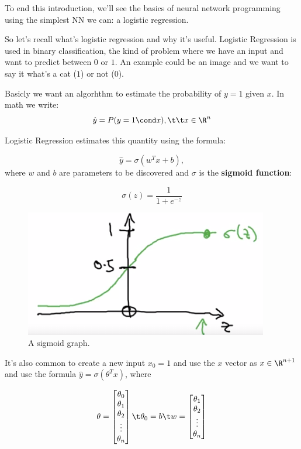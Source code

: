 \documentclass[12pt, a4paper, oneside]{book}
\begin{document}
To end this introduction, we'll see the basics of neural network programming
using the simplest NN we can: a logistic regression.

So let's recall what's logistic regression and why it's useful. Logistic
Regression is used in binary classification, the kind of problem where we have
an input and want to predict between $0$ or $1$. An example could be an image
and we want to say it what's a cat ($1$) or not ($0$).

Basicly we want an algorhthm to estimate the probability of $y=1$ given $x$. In
math we write:
\[
    \hat{y}=P(y=1\cond x),\t\t x\in\R^{n}
\]

Logistic Regression estimates this quantity using the formula:

\[
    \hat{y}=\sigma(w^{T}x+b),
\]
where $w$ and $b$ are parameters to be discovered and $\sigma$ is the
\textbf{sigmoid function}:

\[
    \sigma(z) = \dfrac{1}{1+e^{-z}}
\]

\begin{figure}[h]
\centering
\includegraphics[scale=0.7]{Res/sigmoid.png}
\caption{A sigmoid graph.}
\label{sigmoid.png}
\end{figure}

It's also common to create a new input $x_0=1$ and use the $x$ vector as
$x\in\R^{n+1}$ and use the formula $\hat{y}=\sigma(\theta^{T}x)$, where

\[
\theta=\begin{bmatrix}
    \theta_0 \\ \theta_1 \\ \theta_2 \\ \vdots \\ \theta_n
\end{bmatrix}\t \theta_0=b\t w=\begin{bmatrix}
    \theta_1 \\ \theta_2 \\ \vdots \\ \theta_n
\end{bmatrix}
\]
\end{document}
